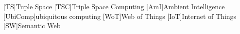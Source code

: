 


[TS]{Tuple Space}
[TSC]{Triple Space Computing}
[AmI]{Ambient Intelligence}
[UbiComp]{ubiquitous computing}
[WoT]{Web of Things}
[IoT]{Internet of Things}
[SW]{Semantic Web}


